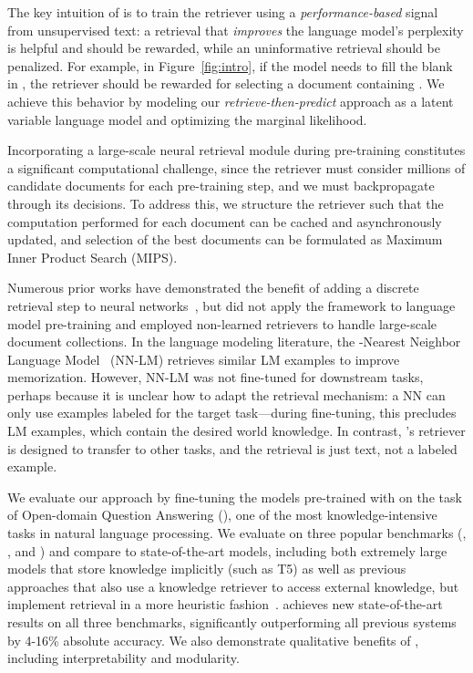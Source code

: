 \documentclass{article}
\begin{document}
The key intuition of \thename is to
train the retriever using a {\em performance-based} signal from unsupervised text:
a retrieval that {\em improves} the language model's perplexity is helpful and should be rewarded, while an uninformative retrieval should be penalized. 
For example, in Figure~\ref{fig:intro}, if the model needs to fill the blank in , the retriever should be rewarded for selecting a document containing . We achieve this behavior by modeling our {\em retrieve-then-predict} approach as a latent variable language model and optimizing the marginal likelihood.

Incorporating a large-scale neural retrieval module
during pre-training constitutes a significant computational challenge, since the retriever must consider millions of candidate documents for each pre-training step, and we must backpropagate through its decisions. To address this, we structure the retriever such that the computation performed for each document can be cached and asynchronously updated, and selection of the best documents can be formulated as Maximum Inner Product Search (MIPS).

Numerous prior works have
demonstrated the benefit of adding a discrete retrieval step to neural networks~\cite{key_value_memorynetwork, drqa}, but did not apply the framework
to language model pre-training and employed non-learned retrievers to handle large-scale document collections.
In the language modeling literature, the -Nearest Neighbor Language Model~\cite{knnlm} (NN-LM) retrieves similar LM examples to improve memorization. However, NN-LM was not fine-tuned for downstream tasks, perhaps because it is unclear how to adapt the retrieval mechanism: a NN can only use examples labeled for the target task---during fine-tuning, this precludes LM examples, which contain the desired world knowledge. In contrast, \thename's retriever is designed to transfer to other tasks, and the retrieval is just text, not a labeled example.

We evaluate our approach by fine-tuning the models pre-trained with \thename on the task of Open-domain Question Answering (\openqa), one of the most knowledge-intensive tasks in natural language processing.
We evaluate on three popular \openqa benchmarks (\nq, \wq, and \trec) and compare to state-of-the-art \openqa models, including both extremely large models that store knowledge implicitly (such as T5) as well as previous approaches that also use a knowledge retriever to access external knowledge, but implement retrieval in a more heuristic fashion~\cite{orqa,openqa_hardem,rrp_salesforce}. \thename achieves new state-of-the-art results on all three benchmarks, significantly outperforming all previous systems by 4-16\% absolute accuracy. We also demonstrate qualitative benefits of \thename, including interpretability and modularity.
\end{document}
